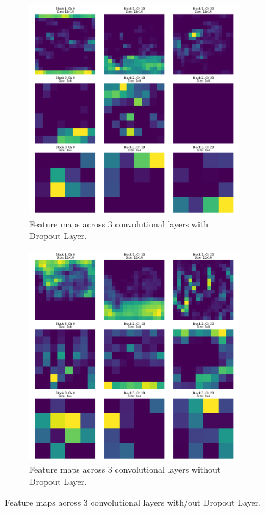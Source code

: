\begin{figure}[H]
    \centering
    \begin{subfigure}[t]{0.48\textwidth}
        \centering
        \includegraphics[width=\textwidth]{images/ex_3_feature_maps_visualization_dropout.png}
        \caption{Feature maps across 3 convolutional layers with Dropout Layer.}
    \end{subfigure}
    \hfill
    \begin{subfigure}[t]{0.48\textwidth}
        \centering
        \includegraphics[width=\textwidth]{images/ex_3_feature_maps_visualization.png}
        \caption{Feature maps across 3 convolutional layers without Dropout Layer.}
    \end{subfigure}
    \caption{Feature maps across 3 convolutional layers with/out Dropout Layer.}
\end{figure}

